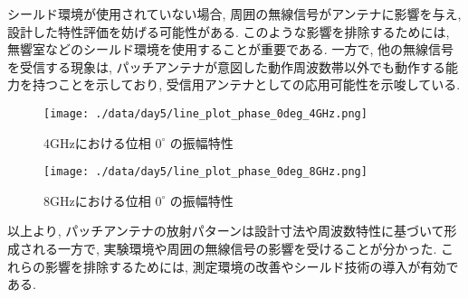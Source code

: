 \documentclass[a4paper, twocolumn]{article} %
\begin{document}
シールド環境が使用されていない場合, 周囲の無線信号がアンテナに影響を与え, 設計した特性評価を妨げる可能性がある. このような影響を排除するためには, 無響室などのシールド環境を使用することが重要である. 一方で, 他の無線信号を受信する現象は, パッチアンテナが意図した動作周波数帯以外でも動作する能力を持つことを示しており, 受信用アンテナとしての応用可能性を示唆している.

\begin{figure}[h]
    \centering
    \texttt{[image: ./data/day5/line\_plot\_phase\_0deg\_4GHz.png]}
    \caption{4GHzにおける位相 \(0^\circ\) の振幅特性}
    \label{fig:line_4GHz}
\end{figure}

\begin{figure}[h]
    \centering
    \texttt{[image: ./data/day5/line\_plot\_phase\_0deg\_8GHz.png]}
    \caption{8GHzにおける位相 \(0^\circ\) の振幅特性}
    \label{fig:line_8GHz}
\end{figure}

以上より, パッチアンテナの放射パターンは設計寸法や周波数特性に基づいて形成される一方で, 実験環境や周囲の無線信号の影響を受けることが分かった. これらの影響を排除するためには, 測定環境の改善やシールド技術の導入が有効である.
\end{document}
